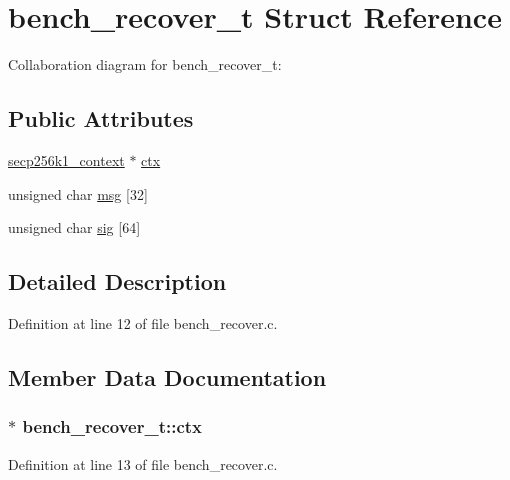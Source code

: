 \hypertarget{structbench__recover__t}{}\section{bench\+\_\+recover\+\_\+t Struct Reference}
\label{structbench__recover__t}


Collaboration diagram for bench\+\_\+recover\+\_\+t\+:
\subsection*{Public Attributes}
\begin{DoxyCompactItemize}
\item 
\hyperlink{secp256k1_8h_a282ec9e6dfec8c35955c3eb2f7476e5e}{secp256k1\+\_\+context} $\ast$ \hyperlink{structbench__recover__t_acc09a09bcc17745c54700b8bc712a6f6}{ctx}
\item 
unsigned char \hyperlink{structbench__recover__t_ae1fb7111eb50d3b09ea073ffa61824ee}{msg} \mbox{[}32\mbox{]}
\item 
unsigned char \hyperlink{structbench__recover__t_a76d1266b30c8d6a55fd52e9bb7c67a85}{sig} \mbox{[}64\mbox{]}
\end{DoxyCompactItemize}


\subsection{Detailed Description}


Definition at line 12 of file bench\+\_\+recover.\+c.



\subsection{Member Data Documentation}
\hypertarget{structbench__recover__t_acc09a09bcc17745c54700b8bc712a6f6}{}
\subsubsection[{ctx}]{$\ast$ bench\+\_\+recover\+\_\+t\+::ctx}\label{structbench__recover__t_acc09a09bcc17745c54700b8bc712a6f6}


Definition at line 13 of file bench\+\_\+recover.\+c.

